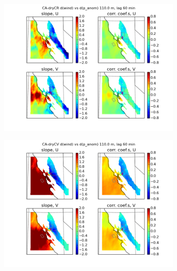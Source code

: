 \begin{figure}[here]
\begin{subfigure}{0.5\textwidth}
\includegraphics[width=\textwidth]{ch3-wind/img/corr_dwind_dpanom_lev110_lag2_dryCR.png}
\caption{}
\end{subfigure}
\begin{subfigure}{0.5\textwidth}
\includegraphics[width=\textwidth]{ch3-wind/img/corr_dwind_dpanom_lev110_lag2_dryCV.png}
\caption{}
\end{subfigure}
\begin{subfigure}{0.5\textwidth}

\end{subfigure}
\end{figure}
